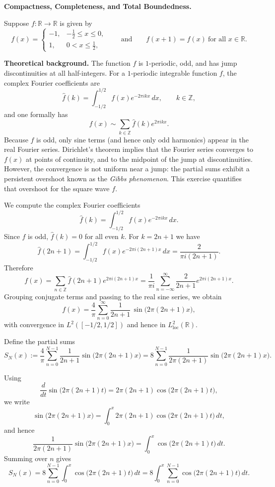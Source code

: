 \begin{problem}[CP-II-0404]
\label{prob:cp-ii-0404}
\textbf{Compactness, Completeness, and Total Boundedness.}

\hspace*{1.5em}Suppose $f:\mathbb{R}\to\mathbb{R}$ is given by
\[
f(x) =
\begin{cases}
	-1, & -\tfrac12 \le x \le 0,\\[0.3em]
	1, & 0 < x \le \tfrac12,
\end{cases}
\qquad\text{and}\qquad
f(x+1) = f(x)\ \text{for all }x\in\mathbb{R}.
\]

\bigskip
\noindent\textbf{Theoretical background.}
The function $f$ is $1$-periodic, odd, and has jump discontinuities at
all half-integers.  For a $1$-periodic integrable function $f$, the
complex Fourier coefficients are
\[
\widehat f(k) = \int_{-1/2}^{1/2} f(x)e^{-2\pi i k x}\,dx,
\qquad k\in\mathbb{Z},
\]
and one formally has
\[
f(x) \sim \sum_{k\in\mathbb{Z}} \widehat f(k)e^{2\pi i k x}.
\]
Because $f$ is odd, only sine terms (and hence only odd harmonics)
appear in the real Fourier series.  Dirichlet's theorem implies that
the Fourier series converges to $f(x)$ at points of continuity, and to
the midpoint of the jump at discontinuities.  However, the convergence
is not uniform near a jump: the partial sums exhibit a persistent
overshoot known as the \emph{Gibbs phenomenon}.  This exercise
quantifies that overshoot for the square wave $f$.

\bigskip

We compute the complex Fourier coefficients
\[
\widehat f(k) = \int_{-1/2}^{1/2} f(x)e^{-2\pi i k x}\,dx.
\]
Since $f$ is odd, $\widehat f(k)=0$ for all even $k$.  For $k=2n+1$ we
have
\[
\widehat f(2n+1)
= \int_{-1/2}^{1/2} f(x)e^{-2\pi i (2n+1)x}\,dx
= \frac{2}{\pi i(2n+1)}.
\]
Therefore
\[
f(x)
= \sum_{n\in\mathbb{Z}} \widehat f(2n+1)e^{2\pi i(2n+1)x}
= \frac{1}{\pi i}\sum_{n=-\infty}^{\infty}
\frac{2}{2n+1}e^{2\pi i(2n+1)x}.
\]
Grouping conjugate terms and passing to the real sine series, we obtain
\[
f(x)
= \frac{4}{\pi}\sum_{n=0}^{\infty}
\frac{1}{2n+1}\,\sin\bigl(2\pi(2n+1)x\bigr),
\]
with convergence in $L^2([-1/2,1/2])$ and hence in
$L^2_{\mathrm{loc}}(\mathbb{R})$.

Define the partial sums
\[
S_N(x)
:= \frac{4}{\pi}\sum_{n=0}^{N-1}\frac{1}{2n+1}
\sin\bigl(2\pi(2n+1)x\bigr)
= 8\sum_{n=0}^{N-1} \frac{1}{2\pi(2n+1)}
\sin\bigl(2\pi(2n+1)x\bigr).
\]

\bigskip

Using
\[
\frac{d}{dt}\sin\bigl(2\pi(2n+1)t\bigr)
= 2\pi(2n+1)\cos\bigl(2\pi(2n+1)t\bigr),
\]
we write
\[
\sin\bigl(2\pi(2n+1)x\bigr)
= \int_0^x 2\pi(2n+1)
\cos\bigl(2\pi(2n+1)t\bigr)\,dt,
\]
and hence
\[
\frac{1}{2\pi(2n+1)}\sin\bigl(2\pi(2n+1)x\bigr)
= \int_0^x \cos\bigl(2\pi(2n+1)t\bigr)\,dt.
\]
Summing over $n$ gives
\[
S_N(x)
= 8\sum_{n=0}^{N-1}\int_0^x
\cos\bigl(2\pi(2n+1)t\bigr)\,dt
= 8\int_0^x \sum_{n=0}^{N-1}
\cos\bigl(2\pi(2n+1)t\bigr)\,dt.
\]


\end{problem}
